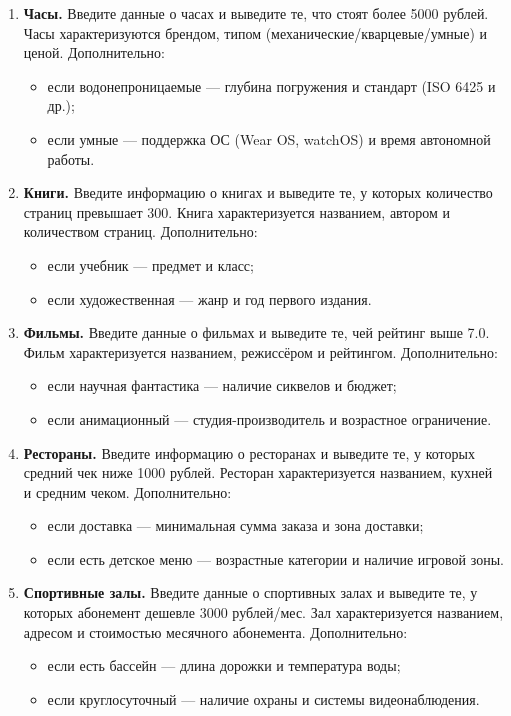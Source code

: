 \begin{enumerate}
    \item \textbf{Часы.}  
    Введите данные о часах и выведите те, что стоят более 5000 рублей.  
    Часы характеризуются брендом, типом (механические/кварцевые/умные) и ценой.  
    Дополнительно:
    \begin{itemize}
        \item если водонепроницаемые — глубина погружения и стандарт (ISO 6425 и др.);
        \item если умные — поддержка ОС (Wear OS, watchOS) и время автономной работы.
    \end{itemize}

    \item \textbf{Книги.}  
    Введите информацию о книгах и выведите те, у которых количество страниц превышает 300.  
    Книга характеризуется названием, автором и количеством страниц.  
    Дополнительно:
    \begin{itemize}
        \item если учебник — предмет и класс;
        \item если художественная — жанр и год первого издания.
    \end{itemize}

    \item \textbf{Фильмы.}  
    Введите данные о фильмах и выведите те, чей рейтинг выше 7.0.  
    Фильм характеризуется названием, режиссёром и рейтингом.  
    Дополнительно:
    \begin{itemize}
        \item если научная фантастика — наличие сиквелов и бюджет;
        \item если анимационный — студия-производитель и возрастное ограничение.
    \end{itemize}

    \item \textbf{Рестораны.}  
    Введите информацию о ресторанах и выведите те, у которых средний чек ниже 1000 рублей.  
    Ресторан характеризуется названием, кухней и средним чеком.  
    Дополнительно:
    \begin{itemize}
        \item если доставка — минимальная сумма заказа и зона доставки;
        \item если есть детское меню — возрастные категории и наличие игровой зоны.
    \end{itemize}

    \item \textbf{Спортивные залы.}  
    Введите данные о спортивных залах и выведите те, у которых абонемент дешевле 3000 рублей/мес.  
    Зал характеризуется названием, адресом и стоимостью месячного абонемента.  
    Дополнительно:
    \begin{itemize}
        \item если есть бассейн — длина дорожки и температура воды;
        \item если круглосуточный — наличие охраны и системы видеонаблюдения.
    \end{itemize}


\end{enumerate}
